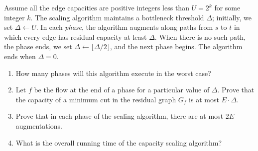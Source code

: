 \begin{exercises}
Assume all the edge capacities are positive integers less than $U = 2^k$ for some integer $k$.
The scaling algorithm maintains a bottleneck threshold $\Delta$; initially, we set $\Delta \gets U$.
In each \textit{phase}, the algorithm augments along paths from $s$ to $t$ in which every edge has residual capacity at least $\Delta$.
When there is no such path, the phase ends, we set $\Delta \gets \lfloor \Delta/2 \rfloor$, and the next phase begins.
The algorithm ends when $\Delta = 0$.
\begin{enumerate}
\item How many phases will this algorithm execute in the worst case?
\item Let $f$ be the flow at the end of a phase for a particular value of $\Delta$.
Prove that the capacity of a minimum cut in the residual graph $G_f$ is at most $E \cdot \Delta$.
\item Prove that in each phase of the scaling algorithm, there are at most $2E$ augmentations.
\item What is the overall running time of the capacity scaling algorithm?
\end{enumerate}
\end{exercises}

